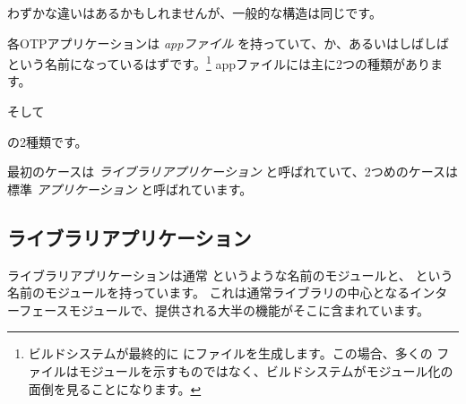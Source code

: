 わずかな違いはあるかもしれませんが、一般的な構造は同じです。

各OTPアプリケーションは \emph{appファイル} を持っていて、か、あるいはしばしば  という名前になっているはずです。\footnote{ビルドシステムが最終的に  にファイルを生成します。この場合、多くの  ファイルはモジュールを示すものではなく、ビルドシステムがモジュール化の面倒を見ることになります。}
appファイルには主に2つの種類があります。


そして


の2種類です。

最初のケースは \emph{ライブラリアプリケーション} と呼ばれていて、2つめのケースは標準 \emph{アプリケーション} と呼ばれています。

\subsection{ライブラリアプリケーション}
\label{subsec:dive-library-applications}

ライブラリアプリケーションは通常  というような名前のモジュールと、  という名前のモジュールを持っています。
これは通常ライブラリの中心となるインターフェースモジュールで、提供される大半の機能がそこに含まれています。


